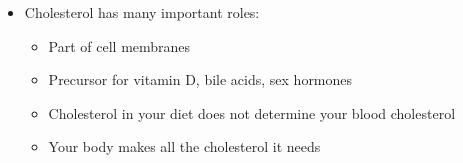 \documentclass[12pt]{article}
\begin{document}
\begin{itemize}
\begin{itemize}
                    \end{itemize}
                \item Cholesterol has many important roles:
                    \begin{itemize}
                        \item Part of cell membranes
                        \item Precursor for vitamin D, bile acids, sex hormones
                        \item Cholesterol in your diet does not determine your blood cholesterol
                        \item Your body makes all the cholesterol it needs
                    \end{itemize}
            \end{itemize}
\end{document}
